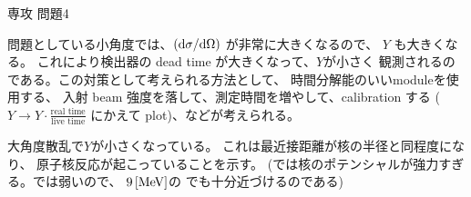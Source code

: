 \documentclass[fleqn]{jbook}
\begin{document}
\begin{answer}{専攻 問題4}{}
\begin{subanswers}
\SubAnswer
  \begin{subsubanswers}
  \SubSubAnswer
    問題としている小角度では、$({\rm d} \sigma / {\rm d} \Omega)$
    が非常に大きくなるので、 $Y$ も大きくなる。
    これにより検出器の dead time が大きくなって、$Y$が小さく
    観測されるのである。この対策として考えられる方法として、
     時間分解能のいいmoduleを使用する、
    入射 beam 強度を落して、測定時間を増やして、calibration する
    ($Y \rightarrow Y \cdot \frac{\mbox{real time}}{\mbox{live time}}$
    にかえて plot)、などが考えられる。

  \SubSubAnswer
    大角度散乱で$Y$が小さくなっている。
    これは最近接距離が核の半径と同程度になり、
    原子核反応が起こっていることを示す。
    (\Au では核のポテンシャルが強力すぎる。\Al では弱いので、
    $9 \,{\rm [MeV]}$の \A でも十分近づけるのである)

  \end{subsubanswers}
\end{subanswers}
\end{answer}
\end{document}
